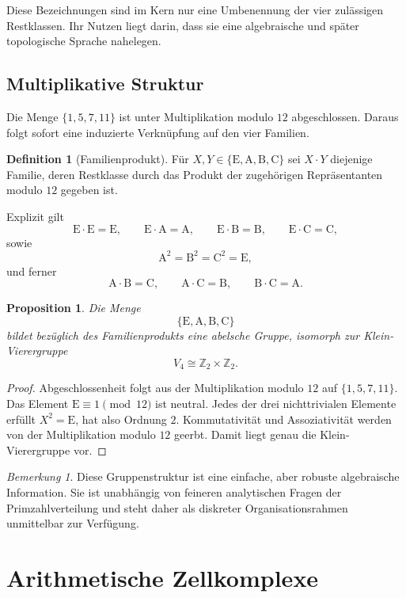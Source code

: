 \documentclass[11pt,a4paper]{article}
\newtheorem{proposition}[theorem]{Proposition}
\theoremstyle{definition}
\newtheorem{definition}[theorem]{Definition}
\theoremstyle{remark}
\newtheorem{remark}[theorem]{Bemerkung}
\newcommand{\Efam}{\mathrm{E}}
\newcommand{\Afam}{\mathrm{A}}
\newcommand{\Bfam}{\mathrm{B}}
\newcommand{\Cfam}{\mathrm{C}}
\begin{document}
	Diese Bezeichnungen sind im Kern nur eine Umbenennung der vier zulässigen Restklassen. Ihr Nutzen liegt darin, dass sie eine algebraische und später topologische Sprache nahelegen.
	
	\subsection{Multiplikative Struktur}
	
	Die Menge $\{1,5,7,11\}$ ist unter Multiplikation modulo $12$ abgeschlossen. Daraus folgt sofort eine induzierte Verknüpfung auf den vier Familien.
	
	\begin{definition}[Familienprodukt]
		Für $X,Y\in\{\Efam,\Afam,\Bfam,\Cfam\}$ sei $X\cdot Y$ diejenige Familie, deren Restklasse durch das Produkt der zugehörigen Repräsentanten modulo $12$ gegeben ist.
	\end{definition}
	
	Explizit gilt
	\[
	\Efam\cdot\Efam=\Efam,\qquad \Efam\cdot\Afam=\Afam,\qquad \Efam\cdot\Bfam=\Bfam,\qquad \Efam\cdot\Cfam=\Cfam,
	\]
	sowie
	\[
	\Afam^2=\Bfam^2=\Cfam^2=\Efam,
	\]
	und ferner
	\[
	\Afam\cdot\Bfam=\Cfam,\qquad
	\Afam\cdot\Cfam=\Bfam,\qquad
	\Bfam\cdot\Cfam=\Afam.
	\]
	
	\begin{proposition}
		Die Menge
		\[
		\{\Efam,\Afam,\Bfam,\Cfam\}
		\]
		bildet bezüglich des Familienprodukts eine abelsche Gruppe, isomorph zur Klein-Vierergruppe
		\[
		V_4\cong \mathbb Z_2\times \mathbb Z_2.
		\]
	\end{proposition}
	
	\begin{proof}
		Abgeschlossenheit folgt aus der Multiplikation modulo $12$ auf $\{1,5,7,11\}$. Das Element $\Efam\equiv 1\pmod{12}$ ist neutral. Jedes der drei nichttrivialen Elemente erfüllt $X^2=\Efam$, hat also Ordnung $2$. Kommutativität und Assoziativität werden von der Multiplikation modulo $12$ geerbt. Damit liegt genau die Klein-Vierergruppe vor.
	\end{proof}
	
	\begin{remark}
		Diese Gruppenstruktur ist eine einfache, aber robuste algebraische Information. Sie ist unabhängig von feineren analytischen Fragen der Primzahlverteilung und steht daher als diskreter Organisationsrahmen unmittelbar zur Verfügung.
	\end{remark}
	
	\section{Arithmetische Zellkomplexe}
	
\end{document}
